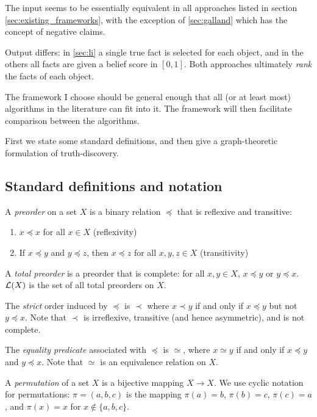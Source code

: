 \documentclass[../main.tex]{subfiles}
\begin{document}
The input seems to be essentially equivalent in all approaches listed in
section \ref{sec:existing_frameworks}, with the exception of \ref{sec:galland}
which has the concept of negative claims.

Output differs: in \ref{sec:li} a single true fact is selected for each object,
and in the others all facts are given a belief score in $[0, 1]$. Both
approaches ultimately \emph{rank} the facts of each object.

The framework I choose should be general enough that all (or at least most)
algorithms in the literature can fit into it. The framework will then
facilitate comparison between the algorithms.

First we state some standard definitions, and then give a graph-theoretic
formulation of truth-discovery.

\subsection{Standard definitions and notation}

\begin{definition}
A \emph{preorder} on a set $X$ is a binary relation $\preceq$ that is reflexive
and transitive:
\begin{enumerate}
\item $x \preceq x$ for all $x \in X$ (reflexivity)
\item If $x \preceq y$ and $y \preceq z$, then $x \preceq z$ for all $x, y, z
\in X$ (transitivity)
\end{enumerate}

A \emph{total preorder} is a preorder that is complete: for all $x, y \in X$,
$x \preceq y$ or $y \preceq x$. $\mathcal{L}(X)$ is the set of all total
preorders on $X$.

The \emph{strict} order induced by $\preceq$ is $\prec$ where $x \prec y$ if
and only if $x \preceq y$ but not $y \preceq x$. Note that $\prec$ is
irreflexive, transitive (and hence asymmetric), and is not complete.

The \emph{equality predicate} associated with $\preceq$ is $\simeq$, where $x
\simeq y$ if and only if $x \preceq y$ and $y \preceq x$. Note that $\simeq$ is
an equivalence relation on $X$.

\end{definition}

\begin{definition}
A \emph{permutation} of a set $X$ is a bijective mapping $X \rightarrow X$. We
use cyclic notation for permutations: $\pi=(a, b, c)$ is the mapping $\pi(a) =
b$, $\pi(b) = c$, $\pi(c) = a$, and $\pi(x) = x$ for $x \notin \{a, b, c\}$.
\end{definition}
\end{document}
